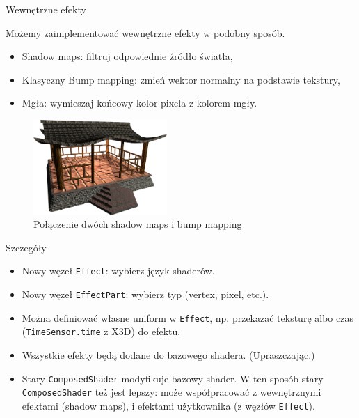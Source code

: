\documentclass{beamer}
\begin{document}
\begin{frame}{Wewnętrzne efekty}

Możemy zaimplementować wewnętrzne efekty w podobny sposób.

\begin{itemize}
  \item Shadow maps: filtruj odpowiednie źródło światła,
  \item Klasyczny Bump mapping: zmień wektor normalny na podstawie tekstury,
  \item Mgła: wymieszaj końcowy kolor pixela z kolorem mgły.
\end{itemize}

\begin{figure}
  \centering
  \includegraphics[width=2in]{../rhan_shrine_5_everything}
  \caption{Połączenie dwóch shadow maps i bump mapping}
\end{figure}
\end{frame}

\begin{frame}{Szczegóły}
\begin{itemize}
  \item Nowy węzeł \texttt{Effect}: wybierz język shaderów.
  \item Nowy węzeł \texttt{EffectPart}: wybierz typ (vertex, pixel, etc.).
  \item Można definiować własne uniform w \texttt{Effect}, np. przekazać
    teksturę albo czas (\texttt{TimeSensor.time} z X3D) do efektu.
  \item Wszystkie efekty będą dodane do bazowego shadera. (Upraszczając.)
  \item Stary \texttt{ComposedShader} modyfikuje bazowy shader.
    W ten sposób stary \texttt{ComposedShader} też jest lepszy:
    może współpracować z wewnętrznymi efektami (shadow maps),
    i efektami użytkownika (z węzłów \texttt{Effect}).
\end{itemize}
\end{frame}
\end{document}
